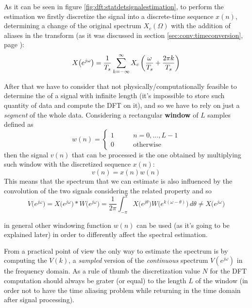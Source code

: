 		As it can be seen in figure \ref{fig:dft:statdetsignalestimation}, to perform the estimation we firstly discretize the signal into a discrete-time sequence $x(n)$, determining a change of the original spectrum $X_c(\Omega)$ with the addition of aliases in the transform (as it was discussed in section \ref{sec:conv:timeconversion}, page \pageref{sec:conv:timeconversion}):
		\begin{equation}
			X\big(e^{j\omega}\big) = \frac 1 {T_s} \sum_{k=-\infty}^\infty X_c\left( \frac \omega{T_s} + \frac{2\pi k}{T_s} \right)
		\end{equation}
		
		After that we have to consider that not physically/computationally feasible to determine the \dtft of a signal with infinite length (it's impossible to store such quantity of data and compute the DFT on it), and so we have to rely on just a \textit{segment} of the whole data. Considering a rectangular \textbf{window} of $L$ samples defined as
		\[ w(n) = \begin{cases}
			1 \qquad & n = 0,\dots, L-1 \\ 0 &\textrm{otherwise}
		\end{cases} \]
		then the signal $v(n)$ that can be processed is the one obtained by multiplying such window with the discretized sequence $x(n)$:
		\[ v(n) = x(n)w(n) \]
		This means that the spectrum that we can estimate is also influenced by the convolution  of the two signals considering the related property and so
		\begin{equation}
			V\big(e^{j\omega}\big) = X\big(e^{j\omega}\big) * W\big(e^{j\omega}\big) = \frac 1{2\pi} \int_{-\pi}^\pi X\big(e^{j\theta}\big) W\big(e^{k(\omega-\theta)}\big)\, d\theta \neq X\big(e^{j\omega}\big)
		\end{equation}
		\begin{note}
			in general other windowing function $w(n)$ can be used (as it's going to be explained later) in order to differently affect the spectral estimation.
		\end{note}
	
		From a practical point of view the only way to estimate the spectrum is by computing the \dft $V(k)$, a \textit{sampled} version of the \textit{continuous} spectrum $V(e^{j\omega})$ in the frequency domain. As a rule of thumb the discretization value $N$ for the 	DFT computation should always be grater (or equal) to the length $L$ of the window (in order not to have the time aliasing problem while returning in the time domain after signal processing).	
		
